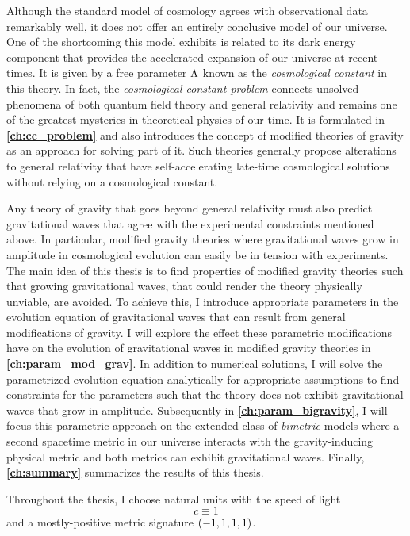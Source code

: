 \documentclass[12pt,parskip=half]{scrreprt}
\begin{document}
Although the \LCDM standard model of cosmology agrees with observational data remarkably well, it does not offer an entirely conclusive model of our universe. One of the shortcoming this model exhibits is related to its dark energy component that provides the accelerated expansion of our universe at recent times. It is given by a free parameter \(\Lambda\) known as the \emph{cosmological constant} in this theory. In fact, the \emph{cosmological constant problem} connects unsolved phenomena of both quantum field theory and general relativity and remains one of the greatest mysteries in theoretical physics of our time. It is formulated in \textbf{\autoref{ch:cc_problem}} and also introduces the concept of modified theories of gravity as an approach for solving part of it. Such theories generally propose alterations to general relativity that have self-accelerating late-time cosmological solutions without relying on a cosmological constant.

Any theory of gravity that goes beyond general relativity must also predict gravitational waves that agree with the experimental constraints mentioned above. In particular, modified gravity theories where gravitational waves grow in amplitude in cosmological evolution can easily be in tension with experiments. The main idea of this thesis is to find properties of modified gravity theories such that growing gravitational waves, that could render the theory physically unviable, are avoided. To achieve this, I introduce appropriate parameters in the evolution equation of gravitational waves that can result from general modifications of gravity. I will explore the effect these parametric modifications have on the evolution of gravitational waves in modified gravity theories in \textbf{\autoref{ch:param_mod_grav}}. In addition to numerical solutions, I will solve the parametrized evolution equation analytically for appropriate assumptions to find constraints for the parameters such that the theory does not exhibit gravitational waves that grow in amplitude. Subsequently in \textbf{\autoref{ch:param_bigravity}}, I will focus this parametric approach on the extended class of \emph{bimetric} models where a second spacetime metric in our universe interacts with the gravity-inducing physical metric and both metrics can exhibit gravitational waves. Finally, \textbf{\autoref{ch:summary}} summarizes the results of this thesis.

Throughout the thesis, I choose natural units with the speed of light
\begin{equation}
	c \equiv 1
\end{equation}
and a mostly-positive metric signature \(\del{-1,1,1,1}\).
\end{document}

